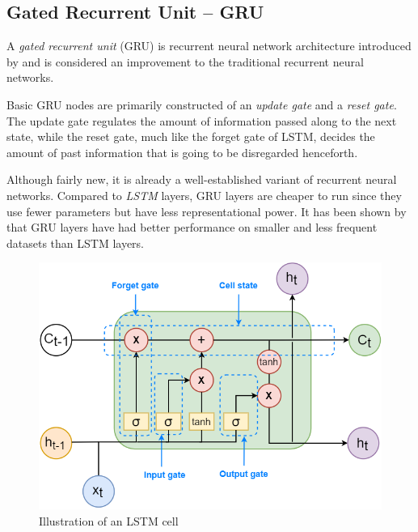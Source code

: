 \documentclass[nofilelist]{cslthse-msc}
\begin{document}
\subsection{Gated Recurrent Unit -- GRU}
A \emph{gated recurrent unit} (GRU) is recurrent neural network architecture introduced by \citet{cho2014learning} and is considered an improvement to the traditional recurrent neural networks. 

Basic GRU nodes  are primarily constructed of an \textit{update gate} and a \textit{reset gate}. The update gate regulates the amount of information passed along to the next state, while the reset gate, much like the forget gate of LSTM, decides the amount of past information that is going to be disregarded henceforth. 

Although fairly new, it is already a well-established variant of recurrent neural networks. Compared to \textit{LSTM} layers, GRU layers are cheaper to run since they use fewer parameters but have less representational power. It has been shown by \citet{Gruber2020AreGC} that GRU layers have had better performance on smaller and less frequent datasets than LSTM layers.


\begin{figure}[!ht]
    \centering
    \includegraphics[scale=0.58]{msccls/explanatory_images/lstm.png}
    \caption{Illustration of an LSTM cell} 
    \label{fig:lstm_node}
\end{figure}
\end{document}
